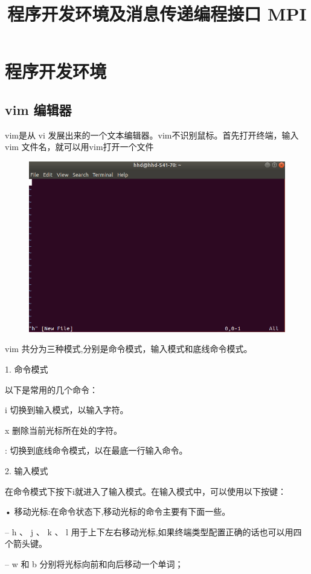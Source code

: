 \documentclass[12pt,a4paper]{article}
\title{ 程序开发环境及消息传递编程接口 MPI }
\author{}
\date{\chntoday}
\begin{document}
\maketitle
\section{ 程序开发环境 }
\subsection{ vim 编辑器 }
vim是从 vi 发展出来的一个文本编辑器。vim不识别鼠标。首先打开终端，输入vim 文件名，就可以用vim打开一个文件
\begin{figure}[H]
\centering
\includegraphics[scale=0.5]{./figures/9.png}
\caption{}
\end{figure}

vim 共分为三种模式,分别是命令模式，输入模式和底线命令模式。

1. 命令模式

以下是常用的几个命令：

i 切换到输入模式，以输入字符。

x 删除当前光标所在处的字符。

: 切换到底线命令模式，以在最底一行输入命令。

2. 输入模式

在命令模式下按下i就进入了输入模式。在输入模式中，可以使用以下按键：

• 移动光标:在命令状态下,移动光标的命令主要有下面一些。

– h 、 j 、 k 、 l 用于上下左右移动光标,如果终端类型配置正确的话也可以用四个箭头键。

– w 和 b 分别将光标向前和向后移动一个单词；
\end{document}
